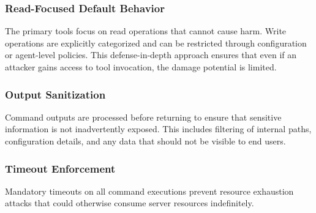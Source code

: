 \subsubsection{Read-Focused Default Behavior}

The primary tools focus on read operations that cannot cause harm. Write operations are explicitly categorized and can be restricted through configuration or agent-level policies. This defense-in-depth approach ensures that even if an attacker gains access to tool invocation, the damage potential is limited.

\subsubsection{Output Sanitization}

Command outputs are processed before returning to ensure that sensitive information is not inadvertently exposed. This includes filtering of internal paths, configuration details, and any data that should not be visible to end users.

\subsubsection{Timeout Enforcement}

Mandatory timeouts on all command executions prevent resource exhaustion attacks that could otherwise consume server resources indefinitely.
